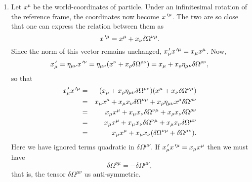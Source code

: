 \begin{enumerate}
\item Let $x^\mu$ be the world-coordinates of particle. Under an infinitesimal 
rotation of the reference frame, the coordinates now become $x^{{\,\prime}\mu}$. The 
two are so close that one can express the relation between them as
\begin{equation}\label{c2e78}
x^{{\,\prime}\mu} = x^\mu + x_\nu\delta\Omega^{\nu\mu}.
\end{equation}
Since the norm of this vector remains unchanged, $x^{\,\prime}_\mu x^{{\,\prime}\mu} = x_\mu 
x^\mu$. Now,
\[
x^{\,\prime}_\mu = 
\eta_{\mu\nu}x^{{\,\prime}\nu} = \eta_{\mu\nu}(x^\nu + x_\rho \delta\Omega^{\rho\nu})
= x_\mu + x_\rho \eta_{\mu\nu}\delta\Omega^{\rho\nu},
\]
so that
\begin{eqnarray*}
x^{\,\prime}_\mu x^{{\,\prime}\mu} &=& 
 (x_\mu + x_\rho \eta_{\mu\nu}\delta\Omega^{\rho\nu})(x^\mu + 
x_\nu\delta\Omega^{\nu\mu}) \\
 &=& x_\mu x^\mu + x_\mu x_\nu \delta\Omega^{\nu\mu} + x_\rho \eta_{\mu\nu}x^\mu 
 \delta\Omega^{\rho\nu} \\
 &=& x_\mu x^\mu + x_\mu x_\nu \delta\Omega^{\nu\mu} + x_\rho x_\nu\delta
 \Omega^{\rho\nu} \\
 &=& x_\mu x^\mu + x_\mu x_\nu \delta\Omega^{\nu\mu} + x_\mu x_\nu\delta
 \Omega^{\mu\nu} \\
 &=& x_\mu x^\mu + x_\mu x_\nu (\delta\Omega^{\nu\mu} + \delta \Omega^{\mu\nu}).
\end{eqnarray*}
Here we have ignored terms quadratic in $\delta\Omega^{\mu\nu}$.
If $x^{\,\prime}_\mu x^{{\,\prime}\mu} = x_\mu x^\mu$ then we must have
\begin{equation}\label{c2e79}
\delta\Omega^{\nu\mu} = -\delta \Omega^{\mu\nu},
\end{equation}
that is, the tensor $\delta\Omega^{\mu\nu}$ us anti-symmetric.


\end{enumerate}
